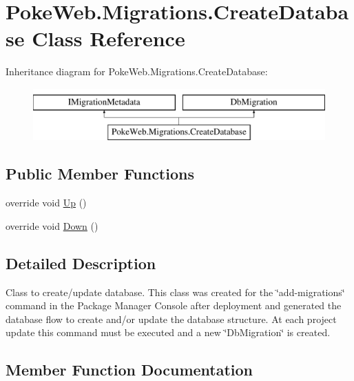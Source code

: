 \hypertarget{class_poke_web_1_1_migrations_1_1_create_database}{}\section{Poke\+Web.\+Migrations.\+Create\+Database Class Reference}
\label{class_poke_web_1_1_migrations_1_1_create_database}
Inheritance diagram for Poke\+Web.\+Migrations.\+Create\+Database\+:\begin{figure}[H]
\begin{center}
\leavevmode
\includegraphics[height=2.000000cm]{class_poke_web_1_1_migrations_1_1_create_database}
\end{center}
\end{figure}
\subsection*{Public Member Functions}
\begin{DoxyCompactItemize}
\item 
override void \mbox{\hyperlink{class_poke_web_1_1_migrations_1_1_create_database_a1cc4a85b9c4fd02e5fc0203416de5e72}{Up}} ()
\item 
override void \mbox{\hyperlink{class_poke_web_1_1_migrations_1_1_create_database_aec9c293cc9c1ab106df22ee035171bad}{Down}} ()
\end{DoxyCompactItemize}


\subsection{Detailed Description}
Class to create/update database. This class was created for the \char`\"{}add-\/migrations\char`\"{} command in the Package Manager Console after deployment and generated the database flow to create and/or update the database structure. At each project update this command must be executed and a new \char`\"{}\+Db\+Migration\char`\"{} is created. 

\subsection{Member Function Documentation}
\mbox{\label{class_poke_web_1_1_migrations_1_1_create_database_aec9c293cc9c1ab106df22ee035171bad}} 
